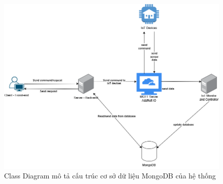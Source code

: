 \begin{figure}[H]
    \centering
    \includegraphics[width=1\linewidth]{content/images/SystemComponents.png}
    \caption{Class Diagram mô tả cấu trúc cơ sở dữ liệu MongoDB của hệ thống}
    \label{fig:classDiagram}
\end{figure}

